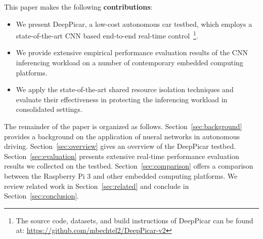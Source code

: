 

This paper makes the following {\bf contributions}:
\begin{itemize}
  \item We present DeepPicar, a low-cost autonomous car testbed, which
    employs a state-of-the-art CNN based end-to-end
    real-time control~\footnote{The source code, datasets, and build
      instructions of DeepPicar can be found at:
      \url{https://github.com/mbechtel2/DeepPicar-v2}}.
  \item We provide extensive empirical performance evaluation results
    of the CNN inferencing workload on a number of contemporary
    embedded computing platforms.
  \item We apply the state-of-the-art shared resource isolation
    techniques and evaluate their effectiveness in protecting the
    inferencing workload in consolidated settings.
\end{itemize}

The remainder of the paper is organized as follows.
Section~\ref{sec:background} provides a background on the application
of nueral networks in autonomous driving.
Section~\ref{sec:overview} gives an overview of the DeepPicar
testbed. Section~\ref{sec:evaluation} presents extensive real-time
performance evaluation results we collected on the testbed.
Section~\ref{sec:comparison} offers a comparison between  
the Raspberry Pi 3 and other embedded computing platforms.
We review related work in
Section~\ref{sec:related} and conclude in
Section~\ref{sec:conclusion}.

